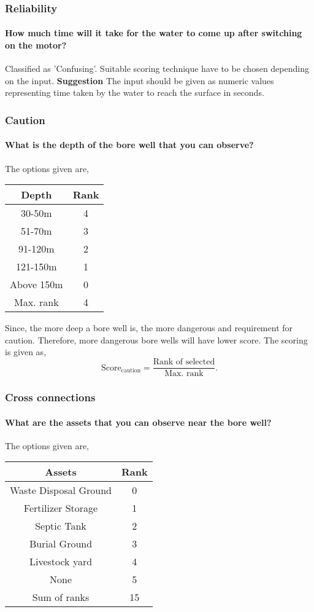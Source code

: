 \documentclass[oneside,twocolumn]{article}
\newcommand{\tsub}[2]{\text{#1}_{\text{#2}}}
\newcommand{\dsub}[2]{\dfrac{\text{#1}}{\text{#2}}}
\newenvironment{ttable}
{
\begin{center}
\begin{tabular}{c|c}
\hline
}
{
\\ \hline
\end{tabular}
\end{center}
}
\begin{document}
\subsubsection{Reliability}
\paragraph{How much time will it take for the water to come up after switching on the motor?}
Classified as 'Confusing'. Suitable scoring technique have to be chosen depending on the input.
\textbf{Suggestion} The input should be given as numeric values representing time taken by the water to reach the surface in seconds.

\subsubsection{Caution}
\paragraph{What is the depth of the bore well that you can observe?}
The options given are,
\begin{ttable}
	Depth & Rank \\ \hline
	30-50m & 4 \\
	51-70m & 3 \\
	91-120m & 2 \\
	121-150m & 1 \\
	Above 150m & 0 \\ \hline
	Max. rank & 4
\end{ttable}
Since, the more deep a bore well is, the more dangerous and requirement for caution. Therefore, more dangerous bore wells will have lower score. The scoring is given as,
\[
	\tsub{Score}{caution} = \dsub{Rank of selected}{Max. rank}.
\]
\subsubsection{Cross connections}
\paragraph{What are the assets that you can observe near the bore well?}
The options given are,
\begin{ttable}
	Assets & Rank \\ \hline
	Waste Disposal Ground & 0 \\
	Fertilizer Storage & 1 \\
	Septic Tank & 2 \\
	Burial Ground & 3 \\
	Livestock yard & 4 \\
	None & 5 \\ \hline
	Sum of ranks & 15
\end{ttable}
\end{document}
